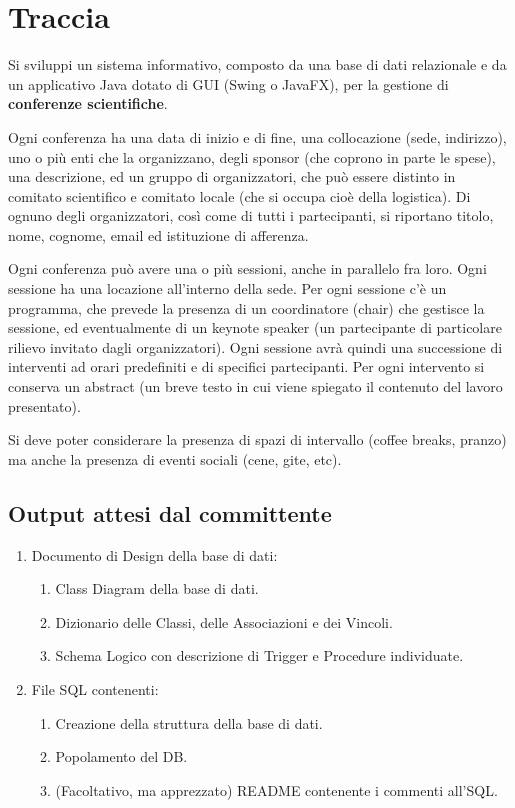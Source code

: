\chapter{Traccia}\label{sez:traccia}
Si sviluppi un sistema informativo, composto da una base di dati relazionale e da un applicativo Java dotato
di GUI (Swing o JavaFX), per la gestione di \textbf{conferenze scientifiche}. 
\bigskip

Ogni conferenza ha una data di inizio e di fine, una collocazione (sede, indirizzo), uno o più enti che la organizzano, degli sponsor (che coprono in parte le spese), una descrizione, ed un gruppo di organizzatori, che può essere distinto in comitato scientifico e comitato locale (che si occupa cioè della logistica). Di ognuno degli organizzatori, così come di tutti i partecipanti, si riportano titolo, nome, cognome, email ed istituzione di afferenza. 
\bigskip

Ogni conferenza può avere una o più sessioni, anche in parallelo fra loro. Ogni sessione ha una locazione all'interno della sede. Per ogni
sessione c'è un programma, che prevede la presenza di un coordinatore (chair) che gestisce la sessione, ed eventualmente di un keynote speaker (un partecipante di particolare rilievo invitato dagli organizzatori). Ogni sessione avrà quindi una successione di interventi ad orari predefiniti e di specifici partecipanti. Per ogni intervento si conserva un abstract (un breve testo in cui viene spiegato il contenuto del lavoro presentato).
\bigskip

Si deve poter considerare la presenza di spazi di intervallo (coffee breaks, pranzo) ma anche la presenza di eventi sociali (cene, gite, etc).
\section{Output attesi dal committente}
\begin{enumerate}
\item Documento di Design della base di dati:
\begin{enumerate}
\item Class Diagram della base di dati.
\item Dizionario delle Classi, delle Associazioni e dei Vincoli.
\item Schema Logico con descrizione di Trigger e Procedure individuate.
\end{enumerate}
\item File SQL contenenti:
\begin{enumerate}
\item Creazione della struttura della base di dati.
\item Popolamento del DB.
\item (Facoltativo, ma apprezzato) README contenente i commenti all’SQL.
\end{enumerate}
\end{enumerate}